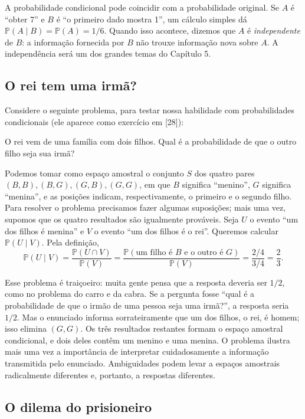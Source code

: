 A probabilidade condicional pode coincidir com a probabilidade original. Se $A$ é ``obter 7'' e $B$ é ``o primeiro dado mostra 1'', um cálculo simples dá $\mathbb{P}(A\mid B)=\mathbb{P}(A)=1/6$. Quando isso acontece, dizemos que $A$ é \emph{independente} de $B$: a informação fornecida por $B$ não trouxe informação nova sobre $A$. A independência será um dos grandes temas do Capítulo 5.

\subsection{O rei tem uma irmã?}
\label{isaac:sec:rei}

Considere o seguinte problema, para testar nossa habilidade com probabilidades condicionais (ele aparece como exercício em [28]):

\begin{example}
\label{isaac:ex:rei}
O rei vem de uma família com dois filhos. Qual é a probabilidade de que o outro filho seja sua irmã?
\end{example}

Podemos tomar como espaço amostral o conjunto $S$ dos quatro pares $(B,B),(B,G),(G,B),(G,G)$, em que $B$ significa ``menino'', $G$ significa ``menina'', e as posições indicam, respectivamente, o primeiro e o segundo filho. Para resolver o problema precisamos fazer algumas suposições; mais uma vez, supomos que os quatro resultados são igualmente prováveis. Seja $U$ o evento ``um dos filhos é menina'' e $V$ o evento ``um dos filhos é o rei''. Queremos calcular $\mathbb{P}(U\mid V)$. Pela definição,
\[
\mathbb{P}(U\mid V)=\frac{\mathbb{P}(U\cap V)}{\mathbb{P}(V)}
=\frac{\mathbb{P}(\text{um filho é }B\text{ e o outro é }G)}{\mathbb{P}(V)}
=\frac{2/4}{3/4}=\frac23.
\]

Esse problema é traiçoeiro: muita gente pensa que a resposta deveria ser $1/2$, como no problema do carro e da cabra. Se a pergunta fosse ``qual é a probabilidade de que o irmão de uma pessoa seja uma irmã?'', a resposta seria $1/2$. Mas o enunciado informa sorrateiramente que um dos filhos, o rei, é homem; isso elimina $(G,G)$. Os três resultados restantes formam o espaço amostral condicional, e dois deles contêm um menino e uma menina. O problema ilustra mais uma vez a importância de interpretar cuidadosamente a informação transmitida pelo enunciado. Ambiguidades podem levar a espaços amostrais radicalmente diferentes e, portanto, a respostas diferentes.

\subsection{O dilema do prisioneiro}
\label{isaac:sec:prisioneiro}

